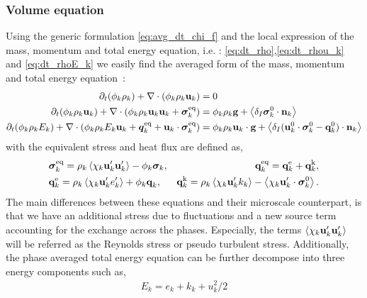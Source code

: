 \subsubsection{Volume equation}
Using the generic formulation \ref{eq:avg_dt_chi_f} and the local expression of the mass, momentum and total energy equation, i.e. : \ref{eq:dt_rho},\ref{eq:dt_rhou_k} and \ref{eq:dt_rhoE_k} we easily find the averaged form of the mass, momentum and total energy equation~: 
\begin{align}
    \label{eq:dt_avg_rho}
    \partial_t (\phi_k \rho_k)  
    + \mathbf{\nabla}\cdot (
        \phi_k \rho_k\textbf{u}_k
    )
    &= 
    0\\
    \label{eq:dt_avg_rhou_k}
    \partial_t (\phi_k \rho_k\textbf{u}_k)  
    + \mathbf{\nabla}\cdot (
        \phi_k \rho_k\textbf{u}_k\textbf{u}_k
        + \bm{\sigma}_k^\text{eq}
    )
    &= 
    \phi_k \rho_k \textbf{g} 
    +  \left<\delta_I \bm{\sigma}_k^0 \cdot \textbf{n}_k\right>\\
    \label{eq:dt_avg_rhoE_k}
    \partial_t (\phi_k\rho_kE_k)  
    + \mathbf{\nabla}\cdot (
        \phi_k\rho_kE_k\textbf{u}_k
        + \bm{q}_k^\text{eq}
        + \textbf{u}_k \cdot \bm{\sigma}_k^\text{eq}
        )
    &= 
    \phi_k \rho_k\textbf{u}_k \cdot \textbf{g} 
    + \left<\delta_I (\textbf{u}_k^0 \cdot \bm{\sigma}_k^0 - \textbf{q}_k^0)\cdot \textbf{n}_k\right>
\end{align} 
with the equivalent stress and heat flux are defined as, 
\begin{align*}
    &\bm{\sigma}_k^\text{eq}
    = 
     \rho_k\avg{\chi_k \textbf{u}_k'\textbf{u}_k'}
      - \phi_k \bm{\sigma}_k,%
    &\textbf{q}_k^\text{eq}
    =\textbf{q}_k^\text{e} +\textbf{q}_k^\text{k},  \\
    &\textbf{q}_k^\text{e}
    = \rho_k \avg{\chi_k\textbf{u}_k' e_k'} 
    + \phi_k\textbf{q}_k,
    &\textbf{q}_k^\text{k}
    = \rho_k \avg{\chi_k \textbf{u}_k' k_k} 
    - \avg{\chi_k \textbf{u}_k' \cdot \bm{\sigma}_k^0}.
\end{align*}
The main differences between these equations and their microscale counterpart, is that we have an additional stress due to fluctuations and a new source term accounting for the exchange across the phases. 
Especially, the terms $\left<\chi_k \textbf{u}_k'\textbf{u}_k'\right>$ will be referred as the Reynolds stress or pseudo turbulent stress. 
Additionally, the phase averaged total energy equation can be further decompose into three energy components such as,  
\begin{align}
    E_k = e_k + k_k + u_k^2/2
    \label{eq:E_def}
\end{align}
